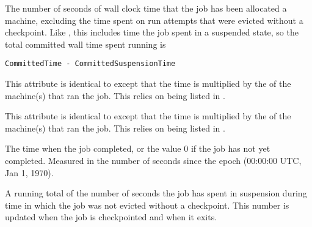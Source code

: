 \begin{description}
\label{CommittedTime}
\item[\AdAttr{CommittedTime}:] The number of seconds of wall clock time
that the job has been allocated a machine,
excluding the time spent on run attempts that
were evicted without a checkpoint.  
Like ,
this includes time the job spent in a suspended state,
so the total committed wall time spent running is 
\begin{verbatim}
CommittedTime - CommittedSuspensionTime
\end{verbatim}

\label{CommittedSlotTime}
\item[\AdAttr{CommittedSlotTime}:] This attribute is identical to
 except that the time is multiplied by the
 of the machine(s) that ran the job.  This relies
on  being listed in .

\label{CumulativeSlotTime}
\item[\AdAttr{CumulativeSlotTime}:] This attribute is identical to
 except that the time is multiplied by the
 of the machine(s) that ran the job.  This relies
on  being listed in .

\item[\AdAttr{CompletionDate}:]  The time when the job completed,
or the value 0 if the job has not yet completed.
Measured in the
number of seconds since the epoch (00:00:00 UTC, Jan 1, 1970).

\item[\AdAttr{CommittedSuspensionTime}:]  A running total of the number of
seconds the job has spent in suspension during time in which the job was
not evicted without a checkpoint.  This number is updated when the job is
checkpointed and when it exits.


\end{description}
